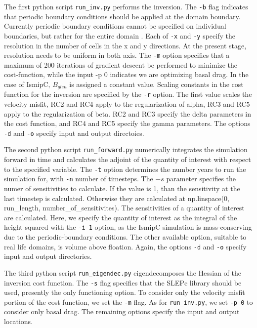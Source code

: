 \documentclass[11pt, reqno, nocenter]{article}
\begin{document}
The first python script {\tt run\_inv.py} performs the inversion. The {\tt -b} flag indicates that periodic boundary conditions should be applied at the domain boundary. Currently periodic boundary conditions cannot be specified on individual boundaries, but rather for the entire domain . Each of {\tt -x} and {\tt -y} specify the resolution in the number of cells in the x and y directions. At the present stage, resolution needs to be uniform in both axis. The {\tt -m} option specifies that a maximum of 200 iterations of gradient descent be performed to minimize the cost-function, while the input {-p 0} indicates we are optimizing basal drag. In the case of IsmipC, $B_{glen}$ is assigned a constant value. Scaling constants in the cost function for the inversion are specified by the {\tt -r} option. The first value scales the velocity misfit, RC2 and RC4 apply to the regularization of alpha, RC3 and RC5 apply to the regularization of beta. RC2 and RC3 specify the delta parameters in the cost function, and RC4 and RC5 specify the gamma parameters. The options {\tt -d} and {\tt -o} specify input and output directoies.

The second python script {\tt run\_forward.py} numerically integrates the simulation forward in time and calculates the adjoint of the quantity of interest with respect to the specified variable. The {\tt -t} option determines the number years to run the simulation for, with {\tt -n} number of timesteps. The $-s$ parameter specifies the numer of sensitivities to calculate. If the value is 1, than the sensitivity at the last timestep is calculated. Otherwise they are calculated at np.linspace(0, run\_length, number\_of\_sensitivites). The sensitivities of a quantity of interest are calculated. Here, we specify the quantity of interest as the integral of the height squared with the {\tt -i 1} option, as the IsmipC simulation is mass-conserving due to the periodic-boundary conditions. The other available option, suitable to real life domains, is volume above floation. Again, the options {\tt -d} and {\tt -o} specify input and output directories.

The third python script {\tt run\_eigendec.py} eigendecomposes the Hessian of the inversion cost function. The {\tt -s} flag specifies that the SLEPc library should be used, presently the only functioning option. To consider only the velocity misfit portion of the cost function, we set the {\tt -m} flag. As for {\tt run\_inv.py}, we set {\tt -p 0} to consider only basal drag. The remaining options specify the input and output locations. 
\end{document}
